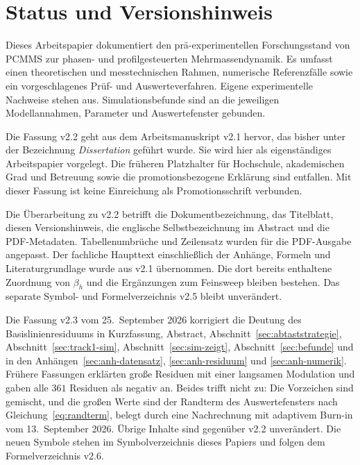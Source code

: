 \documentclass[12pt,a4paper]{report}
\begin{document}

\chapter*{Status und Versionshinweis}

Dieses Arbeitspapier dokumentiert den prä-experimentellen Forschungsstand
von PCMMS zur phasen- und profilgesteuerten Mehrmassendynamik. Es umfasst
einen theoretischen und messtechnischen Rahmen, numerische Referenzfälle
sowie ein vorgeschlagenes Prüf- und Auswerteverfahren. Eigene
experimentelle Nachweise stehen aus. Simulationsbefunde sind an die
jeweiligen Modellannahmen, Parameter und Auswertefenster gebunden.

Die Fassung v2.2 geht aus dem Arbeitsmanuskript v2.1 hervor, das bisher
unter der Bezeichnung \emph{Dissertation} geführt wurde. Sie wird hier
als eigenständiges Arbeitspapier vorgelegt. Die früheren Platzhalter für
Hochschule, akademischen Grad und Betreuung sowie die promotionsbezogene
Erklärung sind entfallen. Mit dieser Fassung ist keine Einreichung als
Promotionsschrift verbunden.

Die Überarbeitung zu v2.2 betrifft die Dokumentbezeichnung, das Titelblatt,
diesen Versionshinweis, die englische Selbstbezeichnung im Abstract und
die PDF-Metadaten. Tabellenumbrüche und Zeilensatz wurden für die
PDF-Ausgabe angepasst. Der fachliche Haupttext einschließlich der Anhänge,
Formeln und Literaturgrundlage wurde aus v2.1 übernommen. Die dort
bereits enthaltene Zuordnung von $\beta_h$ und die Ergänzungen zum
Feinsweep bleiben bestehen. Das separate Symbol- und Formelverzeichnis
v2.5 bleibt unverändert.

Die Fassung v2.3 vom 25.~September 2026 korrigiert die Deutung des
Basislinienresiduums in Kurzfassung, Abstract,
Abschnitt~\ref{sec:abtaststrategie}, Abschnitt~\ref{sec:track1-sim},
Abschnitt~\ref{sec:sim-zeigt}, Abschnitt~\ref{sec:befunde} und in den
Anhängen~\ref{sec:anh-datensatz}, \ref{sec:anh-residuum} und
\ref{sec:anh-numerik}. Frühere Fassungen erklärten große Residuen mit
einer langsamen Modulation und gaben alle $361$ Residuen als negativ an.
Beides trifft nicht zu: Die Vorzeichen sind gemischt, und die großen
Werte sind der Randterm des Auswertefensters nach
Gleichung~\eqref{eq:randterm}, belegt durch eine Nachrechnung mit
adaptivem Burn-in vom 13.~September 2026. Übrige Inhalte sind gegenüber
v2.2 unverändert. Die neuen Symbole stehen im Symbolverzeichnis dieses Papiers und folgen
dem Formelverzeichnis v2.6.
\end{document}
